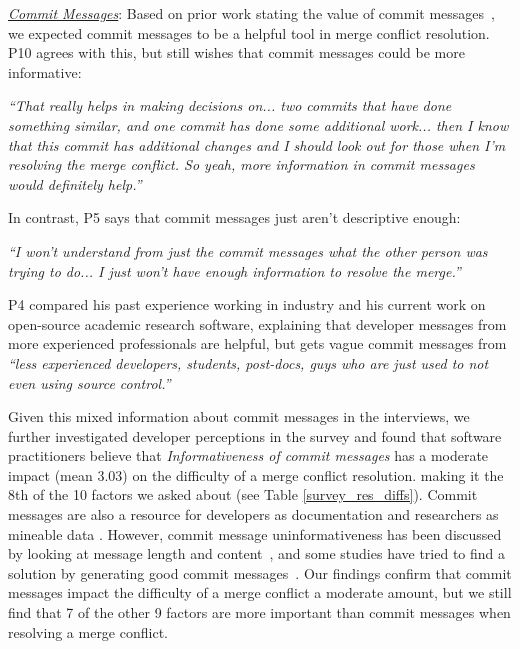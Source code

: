 \underline{\textit{Commit Messages}}:
Based on prior work stating the value of commit messages~\cite{yamauchi2014clustering}\cite{hindle2009automatic}\cite{cortes2014automatically}\cite{hattori2008nature}, we expected commit messages to be a helpful tool in merge conflict resolution. 
P10 agrees with this, but still wishes that commit messages could be more informative:
\begin{displayquote}
	\textit{``That really helps in making decisions on... two commits that have done something similar, and one commit has done some additional work... then I know that this commit has additional changes and I should look out for those when I'm resolving the merge conflict. So yeah, more information in commit messages would definitely help.''}
\end{displayquote}

In contrast, P5 says that commit messages just aren't descriptive enough:
\begin{displayquote}
\textit{``I won't understand from just the commit messages what the other person was trying to do... I just won't have enough information to resolve the merge.''}
\end{displayquote}

P4 compared his past experience working in industry and his current work on open-source academic research software, explaining that developer messages from more experienced professionals are helpful, but gets vague commit messages from \textit{``less experienced developers, students, post-docs, guys who are just used to not even using source control.''}

Given this mixed information about commit messages in the interviews, we further investigated developer perceptions in the survey and found that software practitioners believe that \textit{Informativeness of commit messages} has a moderate impact (mean 3.03) on the difficulty of a merge conflict resolution. making it the 8th  of the 10 factors we asked about (see Table \ref{survey_res_diffs}). Commit messages are also a resource for developers as documentation and researchers as mineable data \cite{d2010commit}. However, commit message uninformativeness has been discussed by looking at message length and content~\cite{maalej2010can}, and some studies have tried to find a solution by generating good commit messages~\cite{cortes2014}. Our findings confirm that commit messages impact the difficulty of a merge conflict a moderate amount, but we still find that 7 of the other 9 factors are more important than commit messages when resolving a merge conflict.

